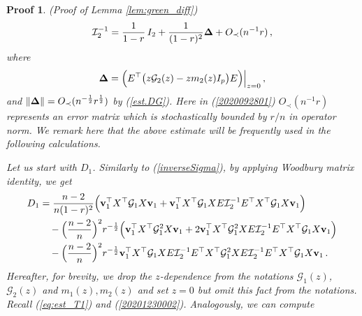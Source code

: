 \documentclass[12pt]{article}
\numberwithin{equation}{section}
\newtheorem{myPro}{Proof}
\theoremstyle{remark}
\newcommand{\1}{{\rm 1}\kern-0.24em{\rm I}}
\begin{document}
\begin{appendices}
\begin{myPro}{(Proof of Lemma \ref{lem:green_diff})}
\begin{align}
 \mathcal{I}_2^{-1} = 
\frac{1}{1-r} \, I_2 + \frac{1}{(1-r)^2} {\bf \Delta} + O_\prec(n^{-1}r)\,,
\end{align}
where 
\begin{align*}
{\bf \Delta} = \Big({E}^{\top} \big(z\mathcal{G}_2(z)- zm_2(z)I_p\big) {E}\Big)\Big|_{z=0}\,,
\end{align*}
and $\Vert {\bf \Delta}\Vert= O_\prec(n^{-\frac 12}r^{\frac 12})$ by (\ref{est.DG}).
Here in (\ref{2020092801}) $O_\prec(n^{-1}r)$ represents an error matrix which  is stochastically bounded by $r/n$ in operator norm.  We remark here that the above estimate will be frequently used in the following calculations. 


Let us start with $D_1$. Similarly to (\ref{inverseSigma}), by applying Woodbury matrix identity, we get 
\begin{align*}
D_1&=\frac{n-2}{n(1-r)^2} \Big( {\bf v}_1^{\top} {X}^{\top} \mathcal{G}_1{X}{\bf v}_1 + {\bf v}_1^{\top} {X}^{\top} \mathcal{G}_1{X}{E}\mathcal{I}_2^{-1}{E}^{\top} {X}^{\top} \mathcal{G}_1 {X}{\bf v}_1\Big) \notag\\
&\quad -\Big(\frac{n-2}{n}\Big)^2 r^{-\frac 12} \Big( {\bf v}_1^{\top} {X}^{\top} \mathcal{G}_1^2{X}{\bf v}_1 + 2{\bf v}_1^{\top} {X}^{\top} \mathcal{G}_1^2{X}{E} \mathcal{I}_2^{-1}{E}^{\top} {X}^{\top} \mathcal{G}_1{X}{\bf v}_1\Big) \notag\\
&\quad - \Big(\frac{n-2}{n}\Big)^2 r^{-\frac 12} {\bf v}_1^{\top} {X}^{\top} \mathcal{G}_1{X}{E} \mathcal{I}_2^{-1}{E}^{\top} {X}^{\top} \mathcal{G}_1^2 {X}{E} \mathcal{I}_2^{-1}{E}^{\top} {X}^{\top} \mathcal{G}_1{X}{\bf v}_1\,.
\end{align*} 
Hereafter, for brevity,  we drop the $z$-dependence  from the notations $\mathcal{G}_1(z)$, $\mathcal{G}_2(z)$ and $m_1(z), m_2 (z)$ and set $z=0$ but omit this fact from the notations. 
Recall (\ref{eq:est_T1}) and (\ref{20201230002}). Analogously, we can compute 

\end{myPro}
\end{appendices}
\end{document}
